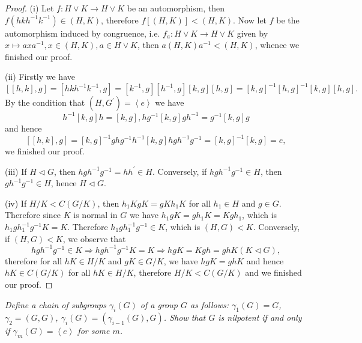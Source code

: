\begin{proof}
(i) Let $f:H\vee K\to H\vee K$ be an automorphism, then $f\left( hkh^{-1}k^{-1} \right) \in \left( H,K \right) $, therefore $f\left[ \left( H,K \right) \right] <\left( H,K \right) $. Now let $f$ be the automorphism induced by congruence, i.e. $f_a:H\lor K\rightarrow H\lor K$ given by $x\mapsto axa^{-1},x\in \left( H,K \right) ,a\in H\lor K$, then $a\left( H,K \right) a^{-1}<\left( H,K \right) $, whence we finished our proof.\par
(ii) Firstly we have
$$
\left[ \left[ h,k \right] ,g \right] =\left[ hkh^{-1}k^{-1},g \right] =\left[ k^{-1},g \right] \left[ h^{-1},g \right] \left[ k,g \right] \left[ h,g \right] =\left[ k,g \right] ^{-1}\left[ h,g \right] ^{-1}\left[ k,g \right] \left[ h,g \right] .
$$
By the condition that $(H,G^\prime)=\left<e\right>$ we have
$$
h^{-1}\left[ k,g \right] h=\left[ k,g \right] ,hg^{-1}\left[ k,g \right] gh^{-1}=g^{-1}\left[ k,g \right] g
$$
and hence 
$$
\left[ \left[ h,k \right] ,g \right] =\left[ k,g \right] ^{-1}ghg^{-1}h^{-1}\left[ k,g \right] hgh^{-1}g^{-1}=\left[ k,g \right] ^{-1}\left[ k,g \right] =e,
$$
we finished our proof.\par
(iii) If $H\lhd G$, then $hgh^{-1}g^{-1}=hh^{\prime}\in H$. Conversely, if $hgh^{-1}g^{-1}\in H$, then $gh^{-1}g^{-1}\in H$, hence $H\lhd G$.\par
(iv) If $H/K<C\left( G/K \right)$, then $h_1KgK=gKh_1K$ for all $h_1\in H$ and $g\in G$. Therefore since $K$ is normal in $G$ we have $h_1gK=gh_1K=Kgh_1$, which is $h_1gh_{1}^{-1}g^{-1}K=K$. Therefore $h_1gh_{1}^{-1}g^{-1}\in K$, which is $(H,G)<K$. Conversely, if $(H,G)<K$, we observe that 
$$
hgh^{-1}g^{-1}\in K\Rightarrow hgh^{-1}g^{-1}K=K\Rightarrow hgK=Kgh=ghK\left( K\lhd G \right) ,
$$
therefore for all $hK\in H/K$ and $gK\in G/K$, we have $hgK=ghK$ and hence $hK\in C\left( G/K \right)$ for all $hK\in H/K$, therefore $H/K<C(G/K)$ and we finished our proof.
\end{proof}
\begin{problem}\em
Define a chain of subgroups $\gamma_i(G)$ of a group $G$ as follows: $\gamma_1(G)=G$, $\gamma_2=(G,G)$, $\gamma_i(G)=(\gamma_{i-1}(G),G)$. Show that $G$ is nilpotent if and only if $\gamma_m(G)=\left<e\right>$ for some $m$.
\end{problem}
